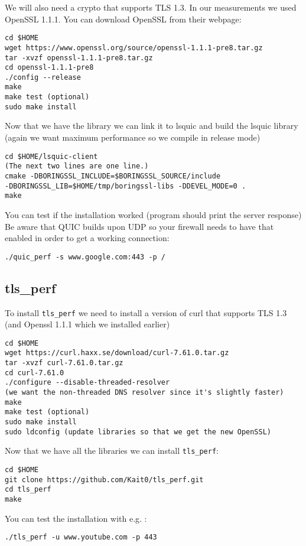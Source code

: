We will also need a crypto that supports TLS 1.3.
In our measurements we used OpenSSL 1.1.1.
You can download OpenSSL from their webpage:
\begin{lstlisting}
cd $HOME
wget https://www.openssl.org/source/openssl-1.1.1-pre8.tar.gz
tar -xvzf openssl-1.1.1-pre8.tar.gz
cd openssl-1.1.1-pre8
./config --release
make
make test (optional)
sudo make install
\end{lstlisting}

Now that we have the library we can link it to lsquic and build the lsquic library (again we want maximum performance so we compile in release mode)
\begin{lstlisting}
cd $HOME/lsquic-client
(The next two lines are one line.)
cmake -DBORINGSSL_INCLUDE=$BORINGSSL_SOURCE/include 
-DBORINGSSL_LIB=$HOME/tmp/boringssl-libs -DDEVEL_MODE=0 .
make
\end{lstlisting}

You can test if the installation worked (program should print the server response)
Be aware that QUIC builds upon UDP so your firewall needs to have that enabled in order to get a working connection:
\begin{lstlisting}
./quic_perf -s www.google.com:443 -p /
\end{lstlisting}

\subsection{tls\_perf}

To install \texttt{tls\_perf} we need to install a version of curl that supports TLS 1.3 (and Openssl 1.1.1 which we installed earlier)
\begin{lstlisting}
cd $HOME
wget https://curl.haxx.se/download/curl-7.61.0.tar.gz
tar -xvzf curl-7.61.0.tar.gz
cd curl-7.61.0
./configure --disable-threaded-resolver 
(we want the non-threaded DNS resolver since it's slightly faster)
make
make test (optional)
sudo make install
sudo ldconfig (update libraries so that we get the new OpenSSL)
\end{lstlisting}

Now that we have all the libraries we can install \texttt{tls\_perf}:
\begin{lstlisting}
cd $HOME
git clone https://github.com/Kait0/tls_perf.git
cd tls_perf
make
\end{lstlisting}

You can test the installation with e.g. :
\begin{lstlisting}
./tls_perf -u www.youtube.com -p 443
\end{lstlisting}

